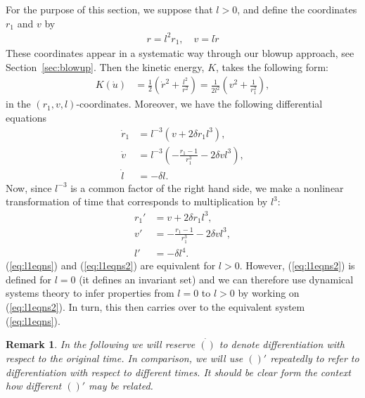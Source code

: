 \documentclass[reqno,12pt]{amsart}
\newcommand{\secref}[1]{Section~\ref{sec:#1}}
\newcommand{\eqlab}[1]{\label{eq:#1}}
\renewcommand{\eqref}[1]{(\ref{eq:#1})}
\newcommand{\remlab}[1]{\label{remark:#1}}
\newtheorem{remark}[theorem]{Remark}
\numberwithin{equation}{section}
\begin{document}
For the purpose of this section, we suppose that $l>0$, and define the coordinates $r_1$ and $v$ by 
\begin{align}
r=l^2 r_1,\quad  v=l\dot r\eqlab{r1veqn}
\end{align} 
These coordinates appear in a systematic way through our blowup approach, see \secref{blowup}.
Then the kinetic energy, $K$, takes the following form:
\begin{equation}\nonumber
\begin{aligned}
 K(\dot u) &= \frac12  \left(\dot r^2 +\frac{l^2}{r^2}\right)=\frac{1}{2l^2} \left(v^2 +\frac{1}{r_1^2}\right),
\end{aligned}
\end{equation}
in the $(r_1,v,l)$-coordinates.
Moreover, we have the following
differential equations
\begin{equation}\eqlab{l1eqns}
\begin{aligned}
 \dot r_1 &=l^{-3} \left(v+2\delta r_1 l^3\right),\\
 \dot v &= l^{-3} \left(-\frac{r_1-1}{r_1^3}-2\delta vl^3\right),\\
 \dot l &=-\delta l.
 \end{aligned}
\end{equation}
Now, since $l^{-3}$ is a common factor of the right hand side, we make a nonlinear transformation of time that corresponds to multiplication by $l^3$:
\begin{equation}\eqlab{l1eqns2}
\begin{aligned}
 r_1' &=v+2\delta r_1 l^3,\\
 v' &= -\frac{r_1-1}{r_1^3}-2\delta vl^3,\\
 l' &=-\delta l^4.
\end{aligned}
\end{equation}
\eqref{l1eqns} and \eqref{l1eqns2} are equivalent for $l>0$. However, \eqref{l1eqns2} is defined for $l=0$ (it defines an invariant set) and we can therefore use dynamical systems theory to infer properties from $l=0$ to $l>0$ by working on \eqref{l1eqns2}. In turn, this then carries over to the equivalent system \eqref{l1eqns}. 

\begin{remark}\remlab{time}
 In the following we will reserve $\dot{()}$ to denote differentiation with respect to the original time. In comparison, we will use $()'$ repeatedly to refer to differentiation with respect to different times. It should be clear form the context how different $()'$ may be related. 
\end{remark}
\end{document}
